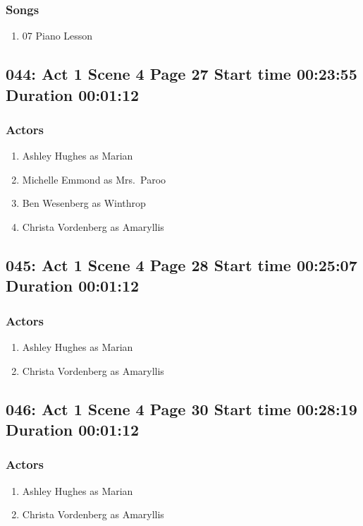 \subsubsection{Songs}
\begin{enumerate}
\item 07 Piano Lesson
\end{enumerate}
\subsection{044: Act 1 Scene 4 Page 27 Start time 00:23:55 Duration 00:01:12}

\subsubsection{Actors}
\begin{enumerate}
\item Ashley Hughes as Marian
\item Michelle Emmond as Mrs.~Paroo
\item Ben Wesenberg as Winthrop
\item Christa Vordenberg as Amaryllis
\end{enumerate}


\subsection{045: Act 1 Scene 4 Page 28 Start time 00:25:07 Duration 00:01:12}

\subsubsection{Actors}
\begin{enumerate}
\item Ashley Hughes as Marian
\item Christa Vordenberg as Amaryllis
\end{enumerate}


\subsection{046: Act 1 Scene 4 Page 30 Start time 00:28:19 Duration 00:01:12}

\subsubsection{Actors}
\begin{enumerate}
\item Ashley Hughes as Marian
\item Christa Vordenberg as Amaryllis
\end{enumerate}

